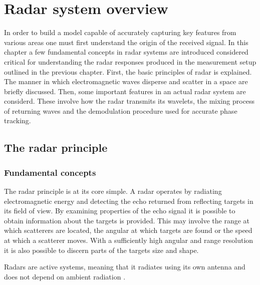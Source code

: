 \chapter{Radar system overview}


In order to build a model capable of accurately capturing key features from various areas one must first understand the origin of the received signal. In this chapter a few fundamental concepts in radar systems are introduced considered critical for understanding the radar responses produced in the measurement setup outlined in the previous chapter. First, the basic principles of radar is explained. The manner in which electromagnetic waves disperse and scatter in a space are briefly discussed. Then, some important features in an actual radar system are considerd. These involve how the radar transmits its wavelets, the mixing process of returning waves and the demodulation procedure used for accurate phase tracking. 

\section{The radar principle}

\subsection{Fundamental concepts}

The radar principle is at its core simple. A radar operates by radiating electromagnetic energy and detecting the echo returned from reflecting targets in its field of view. By examining properties of the echo signal it is possible to obtain information about the targets is provided. This may involve the range at which scatterers are located, the angular at which targets are found or the speed at which a scatterer moves. With a sufficiently high angular and range resolution it is also possible to discern parts of the targets size and shape. 

Radars are active systems, meaning that it radiates using its own antenna and does not depend on ambient radiation . 

\citep{skolnik_2009}



